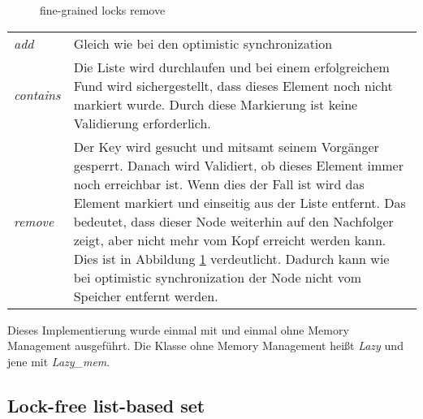 \begin{figure}[H]
	\centering
	\caption{fine-grained locks remove}
	\label{tik:fine-grained-remove}
\end{figure}

\begin{table}[H]
    \begin{tabularx}{\textwidth}{lX}
        \textit{add} & Gleich wie bei den optimistic synchronization\\
		\textit{contains} & Die Liste wird durchlaufen und bei einem erfolgreichem Fund wird sichergestellt, dass dieses Element noch nicht markiert wurde.
		Durch diese Markierung ist keine Validierung erforderlich. \\
		\textit{remove} & Der Key wird gesucht und mitsamt seinem Vorgänger gesperrt. Danach wird Validiert, ob dieses Element immer noch erreichbar ist. 
		Wenn dies der Fall ist wird das Element markiert und einseitig aus der Liste entfernt. Das bedeutet, dass dieser Node weiterhin auf den Nachfolger 
		zeigt, aber nicht mehr vom Kopf erreicht werden kann. Dies ist in Abbildung \ref{tik:fine-grained-remove} verdeutlicht. Dadurch kann wie bei
		optimistic synchronization der Node nicht vom Speicher entfernt werden.\\
    \end{tabularx}
\end{table}

Dieses Implementierung wurde einmal mit und einmal ohne Memory Management ausgeführt. Die Klasse ohne Memory Management heißt \textit{Lazy} und jene mit \textit{Lazy\_mem}.

\subsection{Lock-free list-based set}

